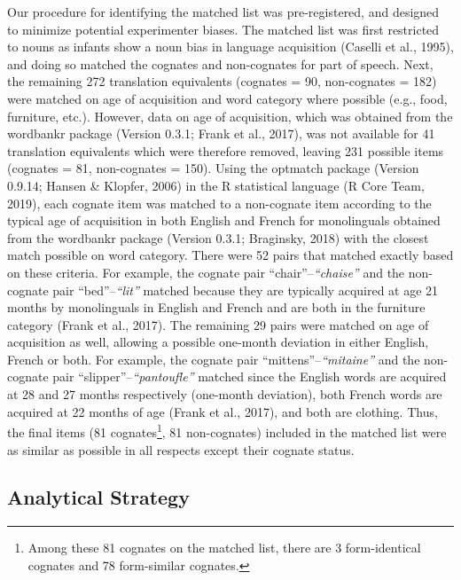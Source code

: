 \documentclass[
  ,man,floatsintext]{apa6}
\begin{document}
Our procedure for identifying the matched list was pre-registered, and designed to minimize potential experimenter biases. The matched list was first restricted to nouns as infants show a noun bias in language acquisition (Caselli et al., 1995), and doing so matched the cognates and non-cognates for part of speech. Next, the remaining 272 translation equivalents (cognates = 90, non-cognates = 182) were matched on age of acquisition and word category where possible (e.g., food, furniture, etc.). However, data on age of acquisition, which was obtained from the wordbankr package (Version 0.3.1; Frank et al., 2017), was not available for 41 translation equivalents which were therefore removed, leaving 231 possible items (cognates = 81, non-cognates = 150). Using the optmatch package (Version 0.9.14; Hansen \& Klopfer, 2006) in the R statistical language (R Core Team, 2019), each cognate item was matched to a non-cognate item according to the typical age of acquisition in both English and French for monolinguals obtained from the wordbankr package (Version 0.3.1; Braginsky, 2018) with the closest match possible on word category. There were 52 pairs that matched exactly based on these criteria. For example, the cognate pair ``chair''--\emph{``chaise''} and the non-cognate pair ``bed''--\emph{``lit''} matched because they are typically acquired at age 21 months by monolinguals in English and French and are both in the furniture category (Frank et al., 2017). The remaining 29 pairs were matched on age of acquisition as well, allowing a possible one-month deviation in either English, French or both. For example, the cognate pair ``mittens''--\emph{``mitaine''} and the non-cognate pair ``slipper''--\emph{``pantoufle''} matched since the English words are acquired at 28 and 27 months respectively (one-month deviation), both French words are acquired at 22 months of age (Frank et al., 2017), and both are clothing. Thus, the final items (81 cognates\footnote{Among these 81 cognates on the matched list, there are 3 form-identical cognates and 78 form-similar cognates.}, 81 non-cognates) included in the matched list were as similar as possible in all respects except their cognate status.

\hypertarget{analytical-strategy}{%
\subsection{Analytical Strategy}\label{analytical-strategy}}
\end{document}
